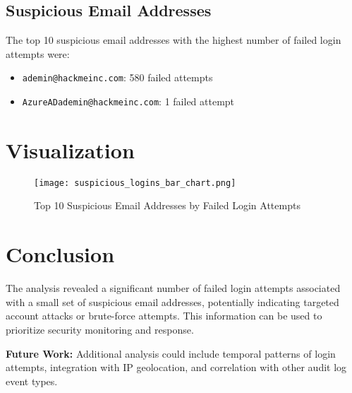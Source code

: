 \documentclass{article}
\begin{document}
\subsection*{Suspicious Email Addresses}

The top 10 suspicious email addresses with the highest number of failed login attempts were:

\begin{itemize}
    \item \texttt{ademin@hackmeinc.com}: 580 failed attempts
    \item \texttt{AzureADademin@hackmeinc.com}: 1 failed attempt
\end{itemize}

\section*{Visualization}

\begin{figure}[h]
    \centering
    \texttt{[image: suspicious\_logins\_bar\_chart.png]}
    \caption{Top 10 Suspicious Email Addresses by Failed Login Attempts}
    \label{fig:bar_chart}
\end{figure}

\section*{Conclusion}

The analysis revealed a significant number of failed login attempts associated with a small set of suspicious email addresses, potentially indicating targeted account attacks or brute-force attempts. This information can be used to prioritize security monitoring and response.

\bigskip

\noindent\textbf{Future Work:} Additional analysis could include temporal patterns of login attempts, integration with IP geolocation, and correlation with other audit log event types.
\end{document}
